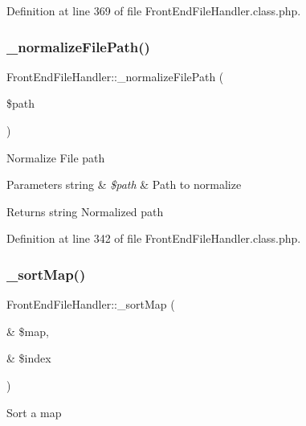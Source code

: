 Definition at line 369 of file Front\+End\+File\+Handler.\+class.\+php.

\mbox{\label{classFrontEndFileHandler_a4818293d9395dd1b4d62b8cabeb04603}} 
\subsubsection{\texorpdfstring{\+\_\+normalize\+File\+Path()}{\_normalizeFilePath()}}
{\footnotesize\ttfamily Front\+End\+File\+Handler\+::\+\_\+normalize\+File\+Path (\begin{DoxyParamCaption}\item[{}]{\$path }\end{DoxyParamCaption})}

Normalize File path


\begin{DoxyParams}[1]{Parameters}
string & {\em \$path} & Path to normalize \\
\hline
\end{DoxyParams}
\begin{DoxyReturn}{Returns}
string Normalized path 
\end{DoxyReturn}


Definition at line 342 of file Front\+End\+File\+Handler.\+class.\+php.

\mbox{\label{classFrontEndFileHandler_a3677abdd2a1a3a17fd1de9f58ffe27a5}} 
\subsubsection{\texorpdfstring{\+\_\+sort\+Map()}{\_sortMap()}}
{\footnotesize\ttfamily Front\+End\+File\+Handler\+::\+\_\+sort\+Map (\begin{DoxyParamCaption}\item[{\&}]{\$map,  }\item[{\&}]{\$index }\end{DoxyParamCaption})}

Sort a map


